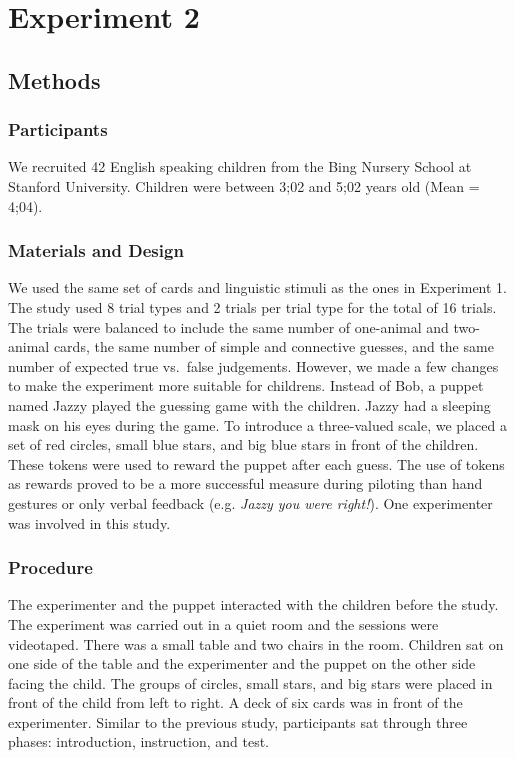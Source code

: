 \documentclass[10pt, letterpaper]{article}
\begin{document}
\section{Experiment 2}\label{experiment-2}

\subsection{Methods}\label{methods-1}

\subsubsection{Participants}\label{participants-1}

We recruited 42 English speaking children from the Bing Nursery School
at Stanford University. Children were between 3;02 and 5;02 years old
(Mean = 4;04).

\subsubsection{Materials and Design}\label{materials-and-design-1}

We used the same set of cards and linguistic stimuli as the ones in
Experiment 1. The study used 8 trial types and 2 trials per trial type
for the total of 16 trials. The trials were balanced to include the same
number of one-animal and two-animal cards, the same number of simple and
connective guesses, and the same number of expected true vs.~false
judgements. However, we made a few changes to make the experiment more
suitable for childrens. Instead of Bob, a puppet named Jazzy played the
guessing game with the children. Jazzy had a sleeping mask on his eyes
during the game. To introduce a three-valued scale, we placed a set of
red circles, small blue stars, and big blue stars in front of the
children. These tokens were used to reward the puppet after each guess.
The use of tokens as rewards proved to be a more successful measure
during piloting than hand gestures or only verbal feedback (e.g.
\emph{Jazzy you were right!}). One experimenter was involved in this
study.

\subsubsection{Procedure}\label{procedure-1}

The experimenter and the puppet interacted with the children before the
study. The experiment was carried out in a quiet room and the sessions
were videotaped. There was a small table and two chairs in the room.
Children sat on one side of the table and the experimenter and the
puppet on the other side facing the child. The groups of circles, small
stars, and big stars were placed in front of the child from left to
right. A deck of six cards was in front of the experimenter. Similar to
the previous study, participants sat through three phases: introduction,
instruction, and test.
\end{document}
